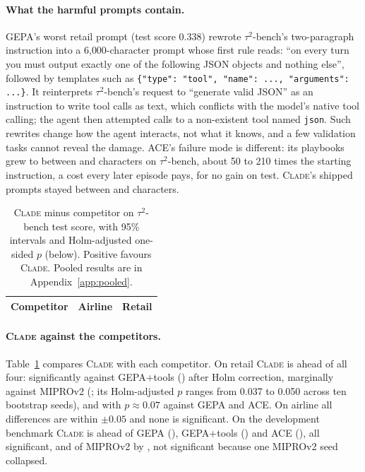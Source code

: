 \documentclass[11pt]{article}
\newcommand{\clade}{\textsc{Clade}\xspace}
\newcommand{\taub}{$\tau^2$-bench\xspace}
\begin{document}
\paragraph{What the harmful prompts contain.} GEPA's worst retail prompt (test score 0.338) rewrote \taub's
two-paragraph instruction into a 6{,}000-character prompt whose first rule reads: ``on every turn you must output
exactly one of the following JSON objects and nothing else'', followed by templates such as
\texttt{\{"type": "tool", "name": ..., "arguments": ...\}}. It reinterprets \taub's request to ``generate valid
JSON'' as an instruction to write tool calls as text, which conflicts with the model's native tool calling; the agent
then attempted calls to a non-existent tool named \texttt{json}. Such rewrites change how the agent interacts, not
what it knows, and a few validation tasks cannot reveal the damage. ACE's failure mode is different: its playbooks
grew to between \sizeAceMin{} and \sizeAceMax{} characters on \taub, about 50 to 210 times the starting instruction, a
cost every later episode pays, for no gain on test. \clade's shipped prompts stayed between \sizeCladeMin{} and
\sizeCladeMax{} characters.

\begin{table}[t]
\centering
\small
\setlength{\tabcolsep}{3pt}
\begin{tabular}{lcc}
\toprule
Competitor & Airline & Retail \\
\midrule

\end{tabular}
\caption{\clade minus competitor on \taub test score, with 95\% intervals and Holm-adjusted one-sided $p$ (below).
Positive favours \clade. Pooled results are in Appendix~\ref{app:pooled}.}
\label{tab:vs}
\end{table}

\paragraph{\clade against the competitors.} Table~\ref{tab:vs} compares \clade with each competitor. On retail
\clade is ahead of all four: significantly against GEPA+tools (\retVsGepatools{}) after Holm correction, marginally
against MIPROv2 (\retVsMipro{}; its Holm-adjusted $p$ ranges from 0.037 to 0.050 across ten bootstrap seeds), and
with $p\approx0.07$ against GEPA and ACE. On airline all differences are within $\pm0.05$ and none is
significant. On the development benchmark \clade is ahead of GEPA (\sdVsGepa{}), GEPA+tools (\sdVsGepatools{}) and
ACE (\sdVsAce{}), all significant, and of MIPROv2 by \sdVsMipro{}, not significant because one MIPROv2 seed collapsed.
\end{document}
